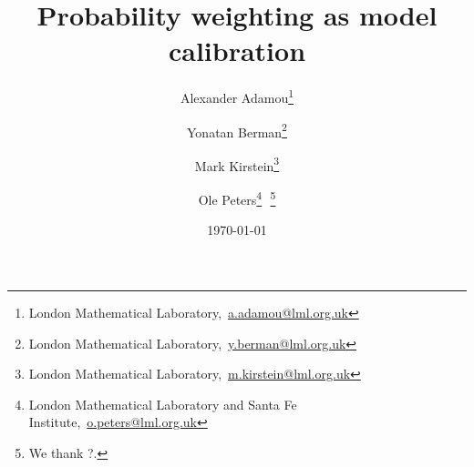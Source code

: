 \documentclass[11pt]{article}
\newcommand{\bc}{\begin{center}}
\newcommand{\ec}{\end{center}}
\newcommand{\red}[1]{\textcolor{red} {#1}}
\numberwithin{equation}{section}
\begin{document}
\begin{titlepage}
\title{Probability weighting as model calibration}
\author{Alexander Adamou\footnote{London Mathematical Laboratory,~\url{a.adamou@lml.org.uk}} \and Yonatan Berman\footnote{London Mathematical Laboratory,~\url{y.berman@lml.org.uk}} \and Mark Kirstein\footnote{London Mathematical Laboratory,~\url{m.kirstein@lml.org.uk}} \and Ole Peters\footnote{London Mathematical Laboratory and Santa Fe Institute,~\url{o.peters@lml.org.uk}}\,\, \thanks{We thank ?.
}}
\date{\today}
\maketitle



\end{titlepage}
\end{document}

